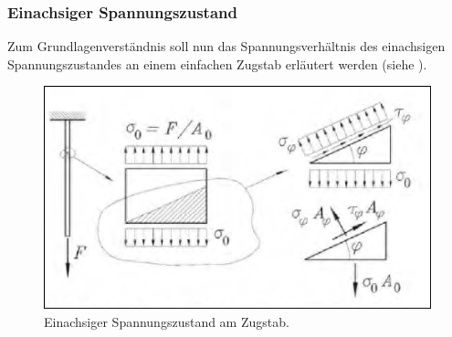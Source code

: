 \documentclass[12pt,a4paper,parskip,twoside,BCOR5mm,headsepline]{scrartcl}
\begin{document}
\begin{description*}
\begin{itemize*}
\subsubsection{Einachsiger Spannungszustand}
Zum Grundlagenverständnis soll nun das Spannungsverhältnis des einachsigen Spannungszustandes an einem einfachen Zugstab erläutert werden (siehe ).
\begin{figure}
\centering
\includegraphics[width=.8\textwidth]{einachsspann}
\caption[Einachsiger Spannungszustand ]{Einachsiger Spannungszustand am Zugstab. \autocite[388]{dd}}
\label{fig:einachsspann} 
\end{figure}


\end{itemize*}
\end{description*}
\end{document}
